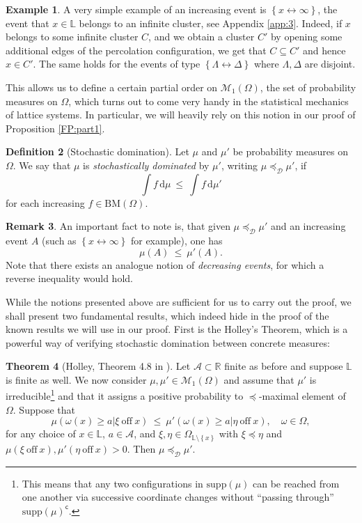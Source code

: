 \documentclass[12pt]{article}
\newcommand{\A}{\mathcal{A}}
\newcommand{\D}{\mathcal{D}}
\renewcommand{\d}{\mathrm{d}}
\renewcommand{\L}{\mathbb{L}}
\newcommand{\M}{\mathcal{M}}
\newcommand{\R}{\mathbb{R}}
\newcommand{\BM}{\mathrm{BM}}
\newcommand{\set}[1]{\left\{#1\right\}}
\newcommand{\1}{\mathbbm{1}}
\renewcommand{\c}{\mathsf{c}}
\newcommand{\supp}{\mathrm{supp}}
\newcommand{\5}{\vspace{0.5cm}}
\theoremstyle{definition}
\newtheorem{thm}{Theorem}[section]
\newtheorem{ex}[thm]{Example}
\newtheorem{df}[thm]{Definition}
\newtheorem{rem}[thm]{Remark}
\begin{document}
\begin{ex}
A very simple example of an increasing event is $\set{x\leftrightarrow\infty}$, the event that $x\in\L$ belongs to an infinite cluster, see Appendix \ref{app:3}. Indeed, if $x$ belongs to some infinite cluster $C$, and we obtain a cluster $C'$ by opening some additional edges of the percolation configuration, we get that $C\subseteq C'$ and hence $x\in C'$. The same holds for the events of type $\set{\Lambda\leftrightarrow\Delta}$ where $\Lambda,\Delta$ are disjoint.
\end{ex}

 This allows us to define a certain partial order on $\M_1(\Omega)$, the set of probability measures on $\Omega$, which turns out to come very handy in the statistical mechanics of lattice systems. In particular, we will heavily rely on this notion in our proof of Proposition \ref{FP:part1}.
 
\begin{df}[Stochastic domination]
Let $\mu$ and $\mu'$ be probability measures on $\Omega$. We say that $\mu$ is \textit{stochastically dominated} by $\mu'$, writing $\mu\preceq_\D\mu'$, if
$$\int f\,\d\mu ~\leq~ \int f\,\d\mu'$$
for each increasing $f\in\BM(\Omega)$.
\end{df}

\begin{rem}
An important fact to note is, that given $\mu\preceq_\D\mu'$ and an increasing event $A$ (such as $\set{x\leftrightarrow\infty}$ for example), one has 
$$\mu(A) ~\leq~ \mu'(A).$$
Note that there exists an analogue notion of \textit{decreasing events}, for which a reverse inequality would hold.
\end{rem}

While the notions presented above are sufficient for us to carry out the proof, we shall present two fundamental results, which indeed hide in the proof of the known results we will use in our proof. First is the Holley's Theorem, which is a powerful way of verifying stochastic domination between concrete measures:
\begin{thm}[Holley, Theorem 4.8 in \cite{GHM}]\label{Holley}
Let $\A\subset\R$ finite as before and suppose $\L$ is finite as well. We now consider $\mu,\mu'\in\M_1(\Omega)$ and assume that $\mu'$ is irreducible\footnote{This means that any two configurations in $\supp(\mu)$ can be reached from one another via successive coordinate changes without ``passing through'' $\supp(\mu)^\c$.} and that it assigns a positive probability to $\preceq$-maximal element of $\Omega$. Suppose that
$$\mu(\omega(x)\geq a|\xi~\text{off}~x) ~\leq~ \mu'(\omega(x)\geq a|\eta~\text{off}~x), \quad \omega\in\Omega,$$
for any choice of $x\in\L$, $a\in \A$, and $\xi,\eta\in\Omega_{\L\setminus\set{x}}$ with $\xi\preceq\eta$ and $\mu(\xi~\text{off}~x),\mu'(\eta~\text{off}~x)>0$. Then $\mu\preceq_\D\mu'$.
\end{thm}
\end{document}
